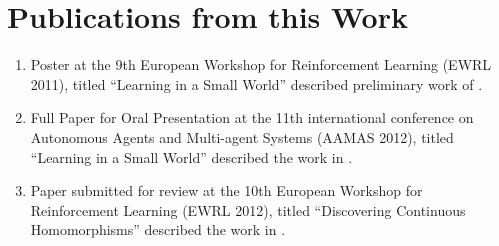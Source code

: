 \chapter{Publications from this Work}

\begin{enumerate}
  \item Poster at the 9th European Workshop for Reinforcement Learning
    (EWRL 2011), titled ``Learning in a Small World'' described
    preliminary work of .
  \item Full Paper for Oral Presentation at the 11th international
    conference on Autonomous Agents and Multi-agent Systems (AAMAS
    2012), titled ``Learning in a Small World'' described
    the work in .
  \item Paper submitted for review at the 10th European Workshop for
    Reinforcement Learning (EWRL 2012), titled ``Discovering Continuous
    Homomorphisms'' described the work in .
\end{enumerate}

